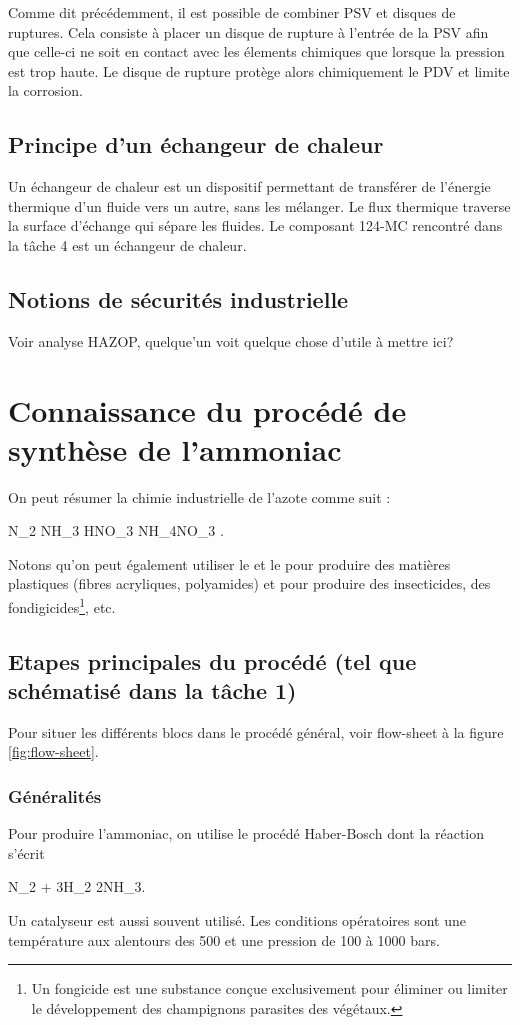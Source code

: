 Comme dit précédemment, il est possible de combiner
PSV et disques de ruptures. Cela consiste à
placer un disque de rupture à l'entrée de la PSV
afin que celle-ci ne soit en contact avec les élements
chimiques que lorsque la pression est trop haute. Le
disque de rupture protège alors chimiquement le PDV et
limite la corrosion.

\subsection{Principe d'un échangeur de chaleur}
Un échangeur de chaleur est un dispositif permettant
de transférer de l'énergie thermique d'un fluide
vers un autre, sans les mélanger. Le flux thermique
traverse la surface d'échange qui sépare les fluides.
Le composant 124-MC rencontré dans la tâche 4 est un
échangeur de chaleur.

\subsection{Notions de sécurités industrielle}
Voir analyse HAZOP, quelque'un voit quelque chose
d'utile à mettre ici?

\section{Connaissance du procédé de synthèse de l'ammoniac}
On peut résumer la chimie industrielle de l'azote comme suit :
\begin{chemmath}
	N_2 \rightarrow NH_3 \rightarrow HNO_3 \rightarrow NH_4NO_3
	\rightarrow {}.
\end{chemmath}
Notons qu'on peut également utiliser le  et le 
pour produire des matières plastiques (fibres acryliques, polyamides)
et pour produire des insecticides, des fondigicides\footnote{Un fongicide
est une substance conçue exclusivement pour éliminer ou limiter le
développement des champignons parasites des végétaux.}, etc.

\subsection{Etapes principales du procédé (tel que schématisé dans la tâche 1)}
Pour situer les différents blocs dans le procédé général, voir 
flow-sheet à la figure \ref{fig:flow-sheet}.
\subsubsection{Généralités}
Pour produire l'ammoniac, on utilise le procédé Haber-Bosch
dont la réaction s'écrit
\begin{chemmath}
	N_2 + 3H_2 \rightarrow 2NH_3.
\end{chemmath}
Un catalyseur est aussi souvent utilisé.
Les conditions opératoires sont une température
aux alentours des \unit{500}{\degreecelsius} et
une pression de 100 à 1000 bars.


